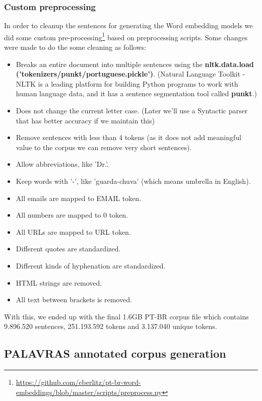 \subsubsection{Custom preprocessing}

In order to cleanup the sentences for generating the Word embedding models we did some custom pre-processing\footnote{\url{https://github.com/eberlitz/pt-br-word-embeddings/blob/master/scripts/preprocess.py}} based on  preprocessing scripts. Some changes were made to do the some cleaning as follows:

\begin{itemize}
    \item Breaks an entire document into multiple sentences using the 
    \textbf{nltk.data.load ('tokenizers/punkt/portuguese.pickle')}. (Natural Language Toolkit - NLTK is a leading platform for building Python programs to work with human language data, and it has a sentence segmentation tool called \textbf{punkt}.)
    \item Does not change the current letter case. (Later we'll use a Syntactic parser that has better accuracy if we maintain this)
    \item Remove sentences with less than 4 tokens (as it does not add meaningful value to the corpus we can remove very short sentences).
    \item Allow abbreviations, like 'Dr.'.
    \item Keep words with '-', like 'guarda-chuva' (which means umbrella in English).
    \item All emails are mapped to EMAIL token.
    \item All numbers are mapped to 0 token.
    \item All URLs are mapped to URL token.
    \item Different quotes are standardized.
    \item Different kinds of hyphenation are standardized.
    \item HTML strings are removed.
    \item All text between brackets is removed.
\end{itemize}

With this, we ended up with the final 1.6GB PT-BR corpus file which contains 9.896.520 sentences, 251.193.592 tokens and 3.137.040 unique tokens.


\subsection{PALAVRAS annotated corpus generation}\label{chap:methodsandmaterials:palavras}

